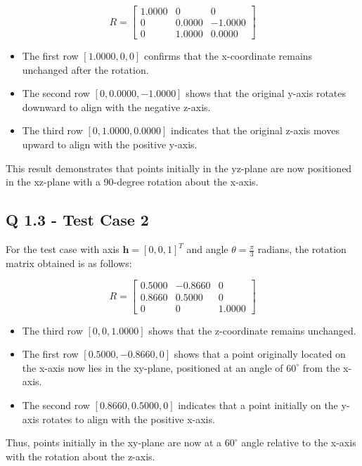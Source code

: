 \[
R = \begin{bmatrix}
1.0000 & 0 & 0 \\
0 & 0.0000 & -1.0000 \\
0 & 1.0000 & 0.0000
\end{bmatrix}
\]

\begin{itemize}
    \item The first row \([1.0000, 0, 0]\) confirms that the x-coordinate remains unchanged after the rotation.
    \item The second row \([0, 0.0000, -1.0000]\) shows that the original y-axis rotates downward to align with the negative z-axis.
    \item The third row \([0, 1.0000, 0.0000]\) indicates that the original z-axis moves upward to align with the positive y-axis.
\end{itemize}

This result demonstrates that points initially in the yz-plane are now positioned in the xz-plane with a 90-degree rotation about the x-axis.

\subsection{Q 1.3 -  Test Case 2}
For the test case with axis \( \mathbf{h} = [0, 0, 1]^T \) and angle \( \theta = \frac{\pi}{3} \) radians, the rotation matrix obtained is as follows:

\[
R = \begin{bmatrix}
0.5000 & -0.8660 & 0 \\
0.8660 & 0.5000 & 0 \\
0 & 0 & 1.0000
\end{bmatrix}
\]

\begin{itemize}
    \item The third row \([0, 0, 1.0000]\) shows that the z-coordinate remains unchanged.
    \item The first row \([0.5000, -0.8660, 0]\) shows that a point originally located on the x-axis now lies in the xy-plane, positioned at an angle of \( 60^\circ \) from the x-axis.
    \item The second row \([0.8660, 0.5000, 0]\) indicates that a point initially on the y-axis rotates to align with the positive x-axis.
\end{itemize}

Thus, points initially in the xy-plane are now at a \( 60^\circ \) angle relative to the x-axis with the rotation about the z-axis.


